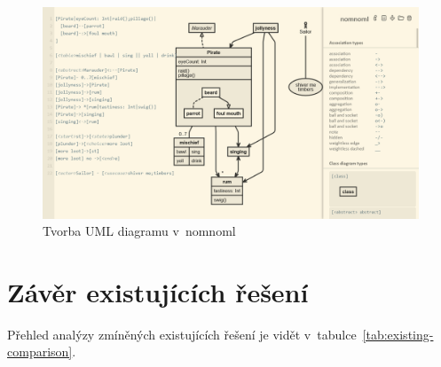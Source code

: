 \begin{figure}
  \centering
  \includegraphics[width = \textwidth]{../img/nomnoml.png}
  \caption{Tvorba UML diagramu v~nomnoml}
  \label{fig:nomnoml}
\end{figure}

\section{Závěr existujících řešení}

Přehled analýzy zmíněných existujících řešení je vidět v~tabulce~\ref{tab:existing-comparison}.

